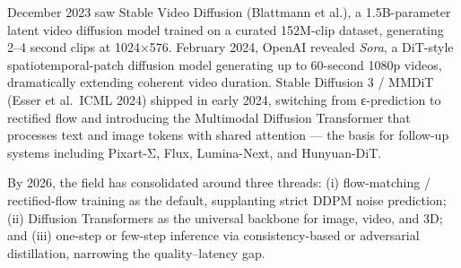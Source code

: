 December 2023 saw Stable Video Diffusion (Blattmann et al.), a 1.5B-parameter latent video diffusion model trained on a curated 152M-clip dataset, generating 2--4 second clips at 1024×576. February 2024, OpenAI revealed \emph{Sora}, a DiT-style spatiotemporal-patch diffusion model generating up to 60-second 1080p videos, dramatically extending coherent video duration. Stable Diffusion 3 / MMDiT (Esser et al.~ICML 2024) shipped in early 2024, switching from ε-prediction to rectified flow and introducing the Multimodal Diffusion Transformer that processes text and image tokens with shared attention --- the basis for follow-up systems including Pixart-Σ, Flux, Lumina-Next, and Hunyuan-DiT.

By 2026, the field has consolidated around three threads: (i) flow-matching / rectified-flow training as the default, supplanting strict DDPM noise prediction; (ii) Diffusion Transformers as the universal backbone for image, video, and 3D; and (iii) one-step or few-step inference via consistency-based or adversarial distillation, narrowing the quality--latency gap.


